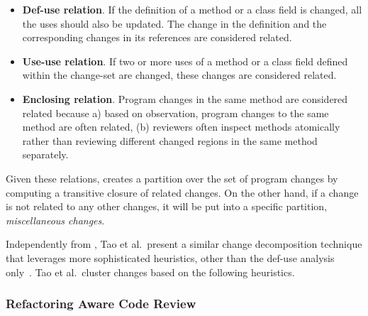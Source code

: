 \documentclass[runningheads,a4paper]{llncs}
\begin{document}
\begin{itemize}
 \item {\bf Def-use relation}. If the definition of a method or a class field is changed, all the uses should also be updated. The change in the definition and the corresponding changes in its references are considered related.
 \item {\bf Use-use relation}. If two or more uses of a method or a class field defined within the change-set are changed, these changes are considered related. 
 \item {\bf Enclosing relation}. Program changes in the same method are considered related because a) based on observation, program changes to the same method are often related, (b) reviewers often inspect methods atomically rather than reviewing different changed regions in the same method separately.
\end{itemize}

Given these relations, {\clusterchanges} creates a partition over the set of program changes by computing a transitive closure of related changes. On the other hand, if a change is not related to any other changes, it will be put into a specific partition, {\em miscellaneous changes}.

Independently from {\clusterchanges}, Tao et al.~present a similar change decomposition technique that leverages more sophisticated heuristics, other than the def-use analysis only~\cite{tao2015partitioning}. Tao et al.~cluster changes based on the following heuristics.

\subsubsection{Refactoring Aware Code Review} 
\end{document}
